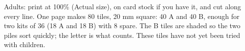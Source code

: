 \documentclass[12pt,letterpaper]{article}
\begin{document}
Adults: print at 100\% (Actual size), on card stock if you have it, and cut along every line. One page makes 80 tiles, 20 mm square: 40 A and 40 B, enough for two kits of 36 (18 A and 18 B) with 8 spare. The B tiles are shaded so the two piles sort quickly; the letter is what counts. These tiles have not yet been tried with children.

\vspace{6mm}
\begin{center}
\end{center}
\end{document}
